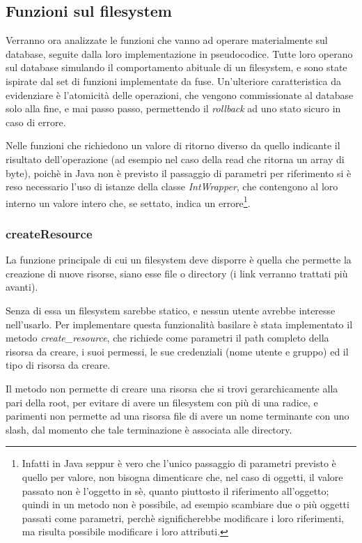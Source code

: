 \newpage

\subsection{Funzioni sul filesystem}
Verranno ora analizzate le funzioni che vanno ad operare materialmente sul database, seguite dalla loro implementazione in pseudocodice. Tutte loro operano sul database simulando il comportamento abituale di un filesystem, e sono state ispirate dal set di funzioni implementate da fuse. Un'ulteriore caratteristica da evidenziare è l'atomicità delle operazioni, che vengono commissionate al database solo alla fine, e mai passo passo, permettendo il \emph{rollback} ad uno stato sicuro in caso di errore.

Nelle funzioni che richiedono un valore di ritorno diverso da quello indicante il risultato dell'operazione (ad esempio nel caso della read che ritorna un array di byte), poichè in Java non è previsto il passaggio di parametri per riferimento si è reso necessario l'uso di istanze della classe \emph{IntWrapper}, che contengono al loro interno un valore intero che, se settato, indica un errore\footnote{Infatti in Java seppur è vero che l'unico passaggio di parametri previsto è quello per valore, non bisogna dimenticare che, nel caso di oggetti, il valore passato non è l'oggetto in sè, quanto piuttosto il riferimento all'oggetto; quindi in un metodo non è possibile, ad esempio scambiare due o più oggetti passati come parametri, perchè significherebbe modificare i loro riferimenti, ma risulta possibile modificare i loro attributi.}.

\subsubsection{createResource}
La funzione principale di cui un filesystem deve disporre è quella che permette la creazione di nuove risorse, siano esse file o directory (i link verranno trattati più avanti). 

Senza di essa un filesystem sarebbe statico, e nessun utente avrebbe interesse nell'usarlo. Per implementare questa funzionalità basilare è stata implementato il metodo \emph{create\_resource}, che richiede come parametri il path completo della risorsa da creare, i suoi permessi, le sue credenziali (nome utente e gruppo) ed il tipo di risorsa da creare.

Il metodo non permette di creare una risorsa che si trovi gerarchicamente alla pari della root, per evitare di avere un filesystem con più di una radice, e parimenti non permette ad una risorsa file di avere un nome terminante con uno slash, dal momento che tale terminazione è associata alle directory.

